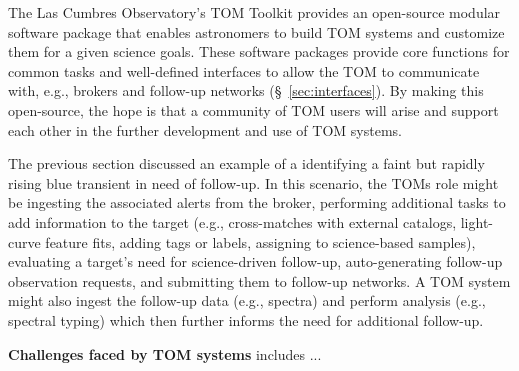 The Las Cumbres Observatory's TOM Toolkit \citep{2018SPIE10707E..11S} provides an open-source modular software package that enables astronomers to build TOM systems and customize them for a given science goals.
These software packages provide core functions for common tasks and well-defined interfaces to allow the TOM to communicate with, e.g., brokers and follow-up networks (\S~\ref{sec:interfaces}).
By making this open-source, the hope is that a community of TOM users will arise and support each other in the further development and use of TOM systems. 

The previous section discussed an example of a identifying a faint but rapidly rising blue transient in need of follow-up.
In this scenario, the TOMs role might be ingesting the associated alerts from the broker, performing additional tasks to add information to the target (e.g., cross-matches with external catalogs, light-curve feature fits, adding tags or labels, assigning to science-based samples), evaluating a target's need for science-driven follow-up, auto-generating follow-up observation requests, and submitting them to follow-up networks.
A TOM system might also ingest the follow-up data (e.g., spectra) and perform analysis (e.g., spectral typing) which then further informs the need for additional follow-up.

{\bf Challenges faced by TOM systems} includes ... 

